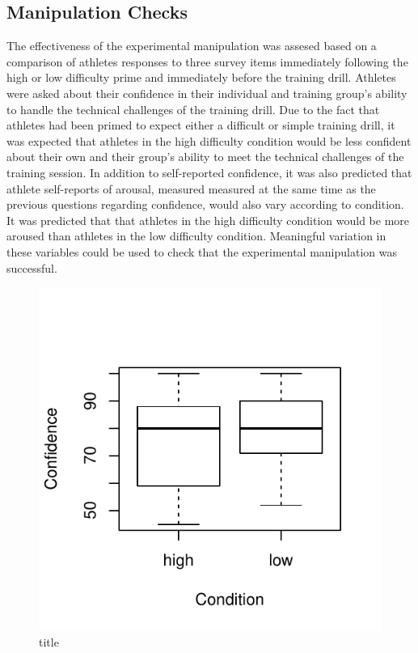 \subsection{Manipulation Checks}
The effectiveness of the experimental manipulation was assesed based on a comparison of athletes responses to three survey items immediately following the high or low difficulty prime and immediately before the training drill.  Athletes were asked about their confidence in their individual and training group's ability to handle the technical challenges of the training drill.  Due to the fact that athletes had been primed to expect either a difficult or simple training drill, it was expected that athletes in the high difficulty condition would be less confident about their own and their group's ability to meet the technical challenges of the training session.
In addition to self-reported confidence, it was also predicted that athlete self-reports of arousal, measured measured at the same time as the previous questions regarding confidence, would also vary according to condition.  It was predicted that that athletes in the high difficulty condition would be more aroused than athletes in the low difficulty condition.  Meaningful variation in these variables could be used to check that the experimental manipulation was successful.




\begin{figure}
  \centering
   \includegraphics{images/groupConfChallengesBoxplot-1}
  \caption{title}
  \label{fig:groupConfChallengesBoxplot}
\end{figure}

